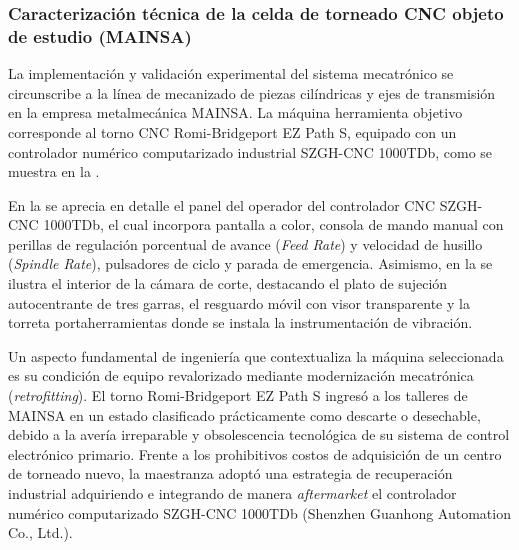 \subsubsection{Caracterización técnica de la celda de torneado CNC objeto de estudio (MAINSA)}
\label{subsubsec:caracterizacion_torno_mainsa}

La implementación y validación experimental del sistema mecatrónico se circunscribe a la línea de mecanizado de piezas cilíndricas y ejes de transmisión en la empresa metalmecánica MAINSA. La máquina herramienta objetivo corresponde al torno CNC Romi-Bridgeport EZ Path S, equipado con un controlador numérico computarizado industrial SZGH-CNC 1000TDb, como se muestra en la .


En la  se aprecia en detalle el panel del operador del controlador CNC SZGH-CNC 1000TDb, el cual incorpora pantalla a color, consola de mando manual con perillas de regulación porcentual de avance (\textit{Feed Rate}) y velocidad de husillo (\textit{Spindle Rate}), pulsadores de ciclo y parada de emergencia. Asimismo, en la  se ilustra el interior de la cámara de corte, destacando el plato de sujeción autocentrante de tres garras, el resguardo móvil con visor transparente y la torreta portaherramientas donde se instala la instrumentación de vibración.



Un aspecto fundamental de ingeniería que contextualiza la máquina seleccionada es su condición de equipo revalorizado mediante modernización mecatrónica (\textit{retrofitting}). El torno Romi-Bridgeport EZ Path S ingresó a los talleres de MAINSA en un estado clasificado prácticamente como descarte o desechable, debido a la avería irreparable y obsolescencia tecnológica de su sistema de control electrónico primario. Frente a los prohibitivos costos de adquisición de un centro de torneado nuevo, la maestranza adoptó una estrategia de recuperación industrial adquiriendo e integrando de manera \textit{aftermarket} el controlador numérico computarizado SZGH-CNC 1000TDb (Shenzhen Guanhong Automation Co., Ltd.).

